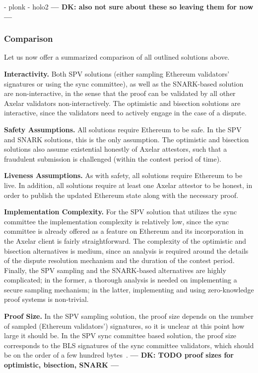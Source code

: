 - plonk
- holo2
\textbf{--- DK: also not sure about these so leaving them for now ---}

\subsubsection{Comparison}

Let us now offer a summarized comparison of all outlined solutions above.

\noindent\textbf{Interactivity.}
Both SPV solutions (either sampling Ethereum validators' signatures or using
the sync committee), as well as the SNARK-based solution are non-interactive,
in the sense that the proof can be validated by all other Axelar validators
non-interactively. The optimistic and bisection solutions are interactive,
since the validators need to actively engage in the case of a dispute.

\noindent\textbf{Safety Assumptions.}
All solutions require Ethereum to be safe. In the SPV and SNARK solutions, this
is the only assumption. The optimistic and bisection solutions also assume
existential honestly of Axelar attestors, such that a fraudulent submission is
challenged (within the contest period of time).

\noindent\textbf{Liveness Assumptions.}
As with safety, all solutions require Ethereum to be live. In addition, all
solutions require at least one Axelar attestor to be honest, in order to
publish the updated Ethereum state along with the necessary proof.

\noindent\textbf{Implementation Complexity.}
For the SPV solution that utilizes the sync committee the implementation
complexity is relatively low, since the sync committee is already offered as a
feature on Ethereum and its incorporation in the Axelar client is fairly
straightforward. The complexity of the optimistic and bisection alternatives is
medium, since an analysis is required around the details of the dispute
resolution mechanism and the duration of the contest period. Finally, the SPV
sampling and the SNARK-based alternatives are highly complicated; in the
former, a thorough analysis is needed on implementing a secure sampling
mechanism; in the latter, implementing and using zero-knowledge proof systems
is non-trivial.

\noindent\textbf{Proof Size.}
In the SPV sampling solution, the proof size depends on the number of sampled
(Ethereum validators') signatures, so it is unclear at this point how large it
should be. In the SPV sync committee based solution, the proof size corresponds
to the BLS signatures of the sync committee validators, which should be on the
order of a few hundred bytes~\cite{sync-committee}.
\textbf{--- DK: TODO proof sizes for optimistic, bisection, SNARK ---}

